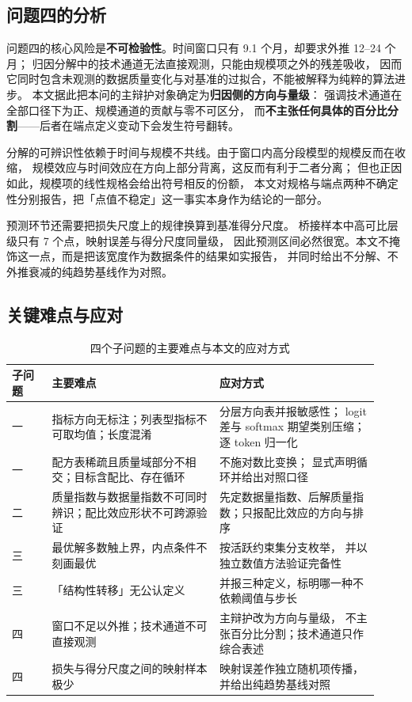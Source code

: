\subsection{问题四的分析}
问题四的核心风险是\textbf{不可检验性}。时间窗口只有 9.1 个月，却要求外推 12–24 个月；
归因分解中的技术通道无法直接观测，只能由规模项之外的残差吸收，
因而它同时包含未观测的数据质量变化与对基准的过拟合，不能被解释为纯粹的算法进步。
本文据此把本问的主辩护对象确定为\textbf{归因侧的方向与量级}：
强调技术通道在全部口径下为正、规模通道的贡献与零不可区分，
而\textbf{不主张任何具体的百分比分割}——后者在端点定义变动下会发生符号翻转。

分解的可辨识性依赖于时间与规模不共线。由于窗口内高分段模型的规模反而在收缩，
规模效应与时间效应在方向上部分背离，这反而有利于二者分离；
但也正因如此，规模项的线性规格会给出符号相反的份额，
本文对规格与端点两种不确定性分别报告，把「点值不稳定」这一事实本身作为结论的一部分。

预测环节还需要把损失尺度上的规律换算到基准得分尺度。
桥接样本中高可比层级只有 7 个点，映射误差与得分尺度同量级，
因此预测区间必然很宽。本文不掩饰这一点，而是把该宽度作为数据条件的结果如实报告，
并同时给出不分解、不外推衰减的纯趋势基线作为对照。

\subsection{关键难点与应对}
\begin{table}[H]
  \centering
  \caption{四个子问题的主要难点与本文的应对方式}
  \label{tab:difficulties}
  \begin{tabular}{@{}p{0.10\linewidth}p{0.42\linewidth}p{0.40\linewidth}@{}}
    \toprule
    子问题 & 主要难点 & 应对方式 \\
    \midrule
    一 & 指标方向无标注；列表型指标不可取均值；长度混淆 & 分层方向表并报敏感性；
      logit 差与 softmax 期望类别压缩；逐 token 归一化 \\
    一 & 配方表稀疏且质量域部分不相交；目标含配比、存在循环 & 不施对数比变换；
      显式声明循环并给出对照口径 \\
    二 & 质量指数与数据量指数不可同时辨识；配比效应形状不可跨源验证 &
      先定数据量指数、后解质量指数；只报配比效应的方向与排序 \\
    三 & 最优解多数触上界，内点条件不刻画最优 & 按活跃约束集分支枚举，
      并以独立数值方法验证完备性 \\
    三 & 「结构性转移」无公认定义 & 并报三种定义，标明哪一种不依赖阈值与步长 \\
    四 & 窗口不足以外推；技术通道不可直接观测 & 主辩护改为方向与量级，
      不主张百分比分割；技术通道只作综合表述 \\
    四 & 损失与得分尺度之间的映射样本极少 & 映射误差作独立随机项传播，
      并给出纯趋势基线对照 \\
    \bottomrule
  \end{tabular}
\end{table}
